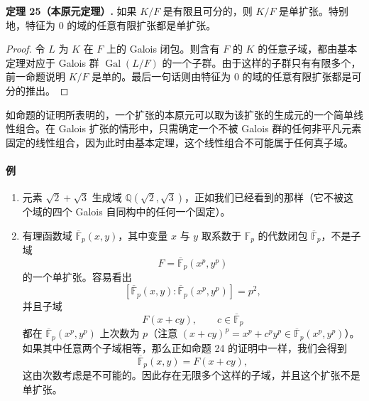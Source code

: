 \noindent\textbf{定理 25（本原元定理）.} 如果 $K/F$ 是有限且可分的，则 $K/F$ 是单扩张。特别地，特征为 $0$ 的域的任意有限扩张都是单扩张。

\begin{proof}
令 $L$ 为 $K$ 在 $F$ 上的 Galois 闭包。则含有 $F$ 的 $K$ 的任意子域，都由基本定理对应于 Galois 群 $\operatorname{Gal}(L/F)$ 的一个子群。由于这样的子群只有有限多个，前一命题说明 $K/F$ 是单的。最后一句话则由特征为 $0$ 的域的任意有限扩张都是可分的推出。
\end{proof}

如命题的证明所表明的，一个扩张的本原元可以取为该扩张的生成元的一个简单线性组合。在 Galois 扩张的情形中，只需确定一个不被 Galois 群的任何非平凡元素固定的线性组合，因为此时由基本定理，这个线性组合不可能属于任何真子域。

\paragraph{例}
\begin{enumerate}[label=(\arabic*)]
\item 元素 $\sqrt2+\sqrt3$ 生成域 $\mathbb Q(\sqrt2,\sqrt3)$，正如我们已经看到的那样（它不被这个域的四个 Galois 自同构中的任何一个固定）。
\item 有理函数域 $\overline{\mathbb F}_p(x,y)$，其中变量 $x$ 与 $y$ 取系数于 $\mathbb F_p$ 的代数闭包 $\overline{\mathbb F}_p$，不是子域
\[
F=\overline{\mathbb F}_p(x^p,y^p)
\]
的一个单扩张。容易看出
\[
[\overline{\mathbb F}_p(x,y):\overline{\mathbb F}_p(x^p,y^p)]=p^2,
\]
并且子域
\[
F(x+cy),\qquad c\in\overline{\mathbb F}_p
\]
都在 $\overline{\mathbb F}_p(x^p,y^p)$ 上次数为 $p$（注意 $(x+cy)^p=x^p+c^py^p\in\overline{\mathbb F}_p(x^p,y^p)$）。如果其中任意两个子域相等，那么正如命题 24 的证明中一样，我们会得到
\[
\overline{\mathbb F}_p(x,y)=F(x+cy),
\]
这由次数考虑是不可能的。因此存在无限多个这样的子域，并且这个扩张不是单扩张。
\end{enumerate}

